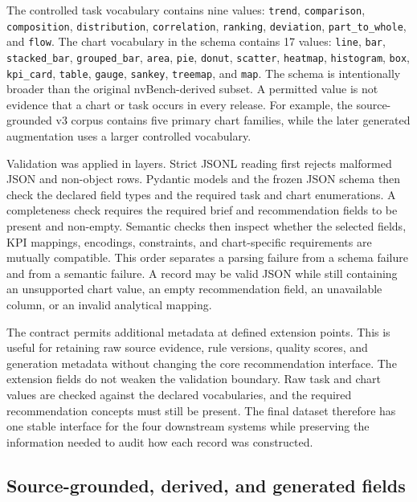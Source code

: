 The controlled task vocabulary contains nine values: \texttt{trend}, \texttt{comparison}, \texttt{composition}, \texttt{distribution}, \texttt{correlation}, \texttt{ranking}, \texttt{deviation}, \texttt{part\_to\_whole}, and \texttt{flow}. The chart vocabulary in the schema contains 17 values: \texttt{line}, \texttt{bar}, \texttt{stacked\_bar}, \texttt{grouped\_bar}, \texttt{area}, \texttt{pie}, \texttt{donut}, \texttt{scatter}, \texttt{heatmap}, \texttt{histogram}, \texttt{box}, \texttt{kpi\_card}, \texttt{table}, \texttt{gauge}, \texttt{sankey}, \texttt{treemap}, and \texttt{map}. The schema is intentionally broader than the original nvBench-derived subset. A permitted value is not evidence that a chart or task occurs in every release. For example, the source-grounded v3 corpus contains five primary chart families, while the later generated augmentation uses a larger controlled vocabulary.

Validation was applied in layers. Strict JSONL reading first rejects malformed JSON and non-object rows. Pydantic models and the frozen JSON schema then check the declared field types and the required task and chart enumerations. A completeness check requires the required brief and recommendation fields to be present and non-empty. Semantic checks then inspect whether the selected fields, KPI mappings, encodings, constraints, and chart-specific requirements are mutually compatible. This order separates a parsing failure from a schema failure and from a semantic failure. A record may be valid JSON while still containing an unsupported chart value, an empty recommendation field, an unavailable column, or an invalid analytical mapping.

The contract permits additional metadata at defined extension points. This is useful for retaining raw source evidence, rule versions, quality scores, and generation metadata without changing the core recommendation interface. The extension fields do not weaken the validation boundary. Raw task and chart values are checked against the declared vocabularies, and the required recommendation concepts must still be present. The final dataset therefore has one stable interface for the four downstream systems while preserving the information needed to audit how each record was constructed.

\subsection{Source-grounded, derived, and generated fields}


